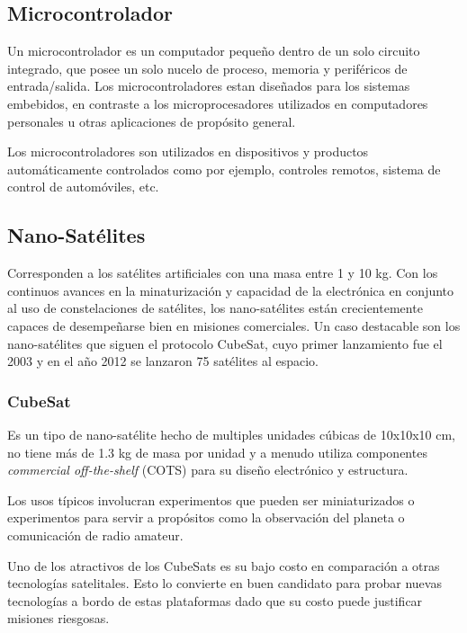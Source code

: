 \documentclass[11pt,letterpaper]{article}
\begin{document}
\subsection{Microcontrolador}
Un microcontrolador es un computador pequeño dentro de un solo circuito integrado, que posee un solo nucelo de proceso, memoria y perif\'ericos de entrada/salida. Los microcontroladores estan diseñados para los sistemas embebidos, en contraste a los microprocesadores utilizados en computadores personales u otras aplicaciones de propósito general.

Los microcontroladores son utilizados en dispositivos y productos automáticamente controlados como por ejemplo, controles remotos, sistema de control de automóviles, etc.

\subsection{Nano-Sat\'elites}
Corresponden a los sat\'elites artificiales con una masa entre 1 y 10 kg. Con los continuos avances en la minaturización y capacidad de la electrónica en conjunto al uso de constelaciones de sat\'elites, los nano-sat\'elites están crecientemente capaces de desempeñarse bien en misiones comerciales. Un caso destacable son los nano-sat\'elites que siguen el protocolo CubeSat, cuyo primer lanzamiento fue el 2003 y en el año 2012 se lanzaron 75 sat\'elites al espacio.

\subsubsection{CubeSat}
Es un tipo de nano-sat\'elite hecho de multiples unidades cúbicas de 10x10x10 cm, no tiene más de 1.3 kg de masa por unidad y a menudo utiliza componentes \textit{commercial off-the-shelf} (COTS) para su diseño electrónico y estructura.

Los usos típicos involucran experimentos que pueden ser miniaturizados o experimentos para servir a propósitos como la observación del planeta o comunicación de radio amateur.

Uno de los atractivos de los CubeSats es su bajo costo en comparación a otras tecnologías satelitales. Esto lo convierte en buen candidato para probar nuevas tecnologías a bordo de estas plataformas dado que su costo puede justificar misiones riesgosas.
\end{document}
